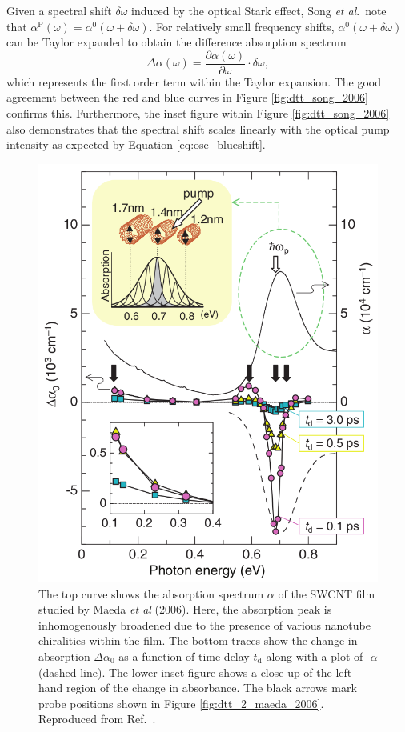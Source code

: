 Given a spectral shift $\delta \omega$ induced by the optical Stark effect, Song \textit{et al}.\ note that $\alpha^\text{P}(\omega) = \alpha^0 (\omega + \delta \omega)$. For relatively small frequency shifts, $\alpha^0 (\omega + \delta \omega)$ can be Taylor expanded to obtain the difference absorption spectrum
\begin{equation}
	\Delta \alpha(\omega) = \frac{\partial \alpha(\omega)}{\partial \omega} \cdot \delta\omega,
\end{equation}
which represents the first order term within the Taylor expansion. The good agreement between the red and blue curves in Figure \ref{fig:dtt_song_2006} confirms this. Furthermore, the inset figure within Figure \ref{fig:dtt_song_2006} also demonstrates that the spectral shift scales linearly with the optical pump intensity as expected by Equation \eqref{eq:ose_blueshift}.

\begin{figure}[ht]
	\centering
	\includegraphics[scale=0.35]{images/chapter_prior_works/stark_shift_maeda}
	\caption{The top curve shows the absorption spectrum $\alpha$ of the SWCNT film studied by Maeda \textit{et al} (2006). Here, the absorption peak is inhomogenously broadened due to the presence of various nanotube chiralities within the film. The bottom traces show the change in absorption $\Delta \alpha_0$ as a function of time delay $t_\text{d}$ along with a plot of -$\alpha$ (dashed line). The lower inset figure shows a close-up of the left-hand region of the change in absorbance. The black arrows mark probe positions shown in Figure \ref{fig:dtt_2_maeda_2006}. Reproduced from Ref.\ \cite{maeda2006gigantic}.}
	\label{fig:abs_maeda_2006}
\end{figure}

